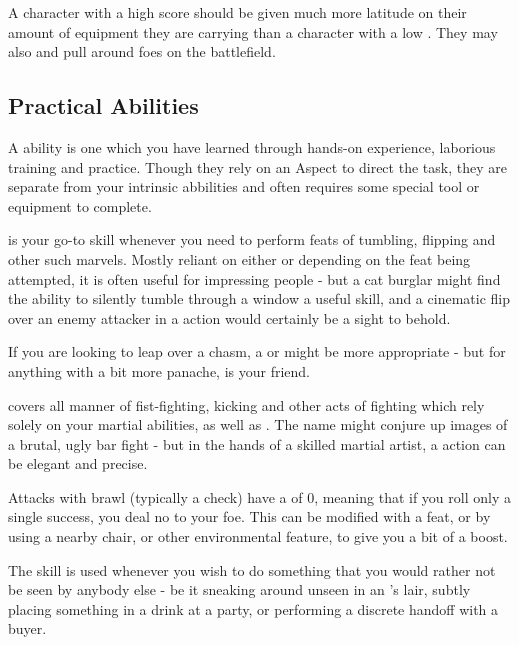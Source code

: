 A character with a high  score should be given much more latitude on their amount of equipment they are carrying than a character with a low . They may also  and pull around foes on the battlefield.


\subsection{Practical Abilities}


A  ability is one which you have learned through hands-on experience, laborious training and practice. Though they rely on an Aspect to direct the task, they are separate from your intrinsic abbilities and often requires some special tool or equipment to complete. 


 is your go-to skill whenever you need to perform feats of tumbling, flipping and other such marvels. Mostly reliant on either  or  depending on the feat being attempted, it is often useful for impressing people - but a cat burglar might find the ability to silently tumble through a window a useful skill, and a cinematic flip over an enemy attacker in a  action would certainly be a sight to behold. 

If you are looking to leap over a chasm, a  or  might be more appropriate - but for anything with a bit more panache,  is your friend.


 covers all manner of fist-fighting, kicking and other acts of fighting which rely solely on your martial abilities, as well as . The name might conjure up images of a brutal, ugly bar fight - but in the hands of a skilled martial artist, a  action can be elegant and precise. 

Attacks with brawl (typically a  check) have a  of 0, meaning that if you roll only a single success, you deal no  to your foe. This can be modified with a  feat, or by using a nearby chair, or other environmental feature, to give you a bit of a boost.


The  skill is used whenever you wish to do something that you would rather not be seen by anybody else - be it sneaking around unseen in an 's lair, subtly placing something in a drink at a party, or performing a discrete handoff with a buyer. 

